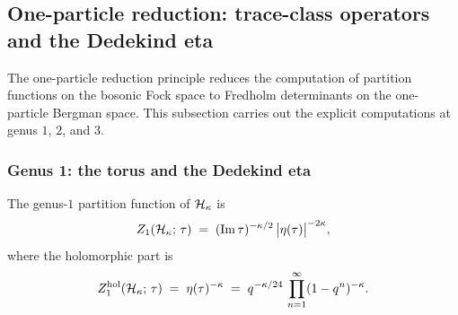 %
%

\subsection{One-particle reduction: trace-class operators
and the Dedekind eta}

The one-particle reduction principle reduces the computation
of partition functions on the bosonic Fock space to Fredholm
determinants on the one-particle Bergman space. This subsection
carries out the explicit computations at genus $1$, $2$, and $3$.

\subsubsection{Genus 1: the torus and the Dedekind eta}

\begin{theorem}%
%
%
The genus-$1$ partition function of $\mathcal{H}_\kappa$ is
\begin{equation}%
Z_1(\cH_\kappa;\,\tau)
\;=\;
(\operatorname{Im}\tau)^{-\kappa/2}\,
\bigl|\dedeta(\tau)\bigr|^{-2\kappa},
\end{equation}
where the holomorphic part is
\begin{equation}%
Z_1^{\mathrm{hol}}(\cH_\kappa;\,\tau)
\;=\;
\dedeta(\tau)^{-\kappa}
\;=\;
q^{-\kappa/24}\,
\prod_{n=1}^{\infty}
(1 - q^n)^{-\kappa}.
\end{equation}
\end{theorem}

